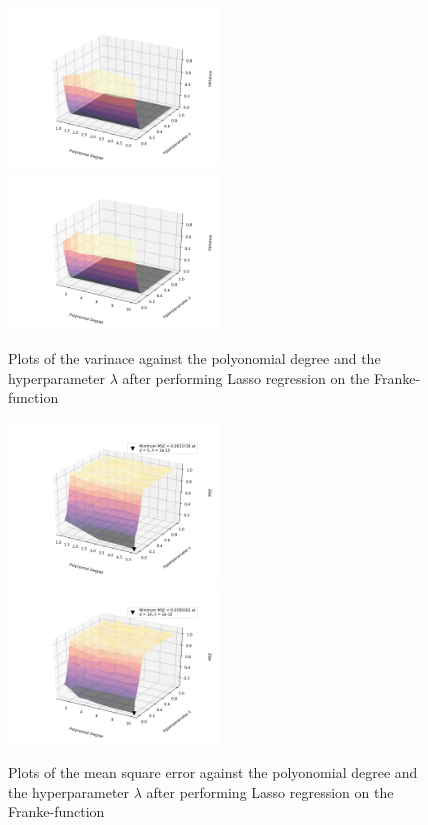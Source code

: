 \documentclass[a4paper,10pt,english]{article}
\begin{document}

\begin{figure}[H]
	\centering 
	\includegraphics[width = 0.5\textwidth, center]{../franke_output/part_E_1.png}
	\includegraphics[width = 0.5\textwidth, center]{../franke_output/part_E_1_highdeg.png}
	\caption{
		Plots of the varinace against the polyonomial degree and the hyperparameter $\lambda$ after performing Lasso regression on the Franke-function
	}
	\label{part_e1}
\end{figure}

\begin{figure}[H]
	\centering 
	\includegraphics[width = 0.5\textwidth, center]{../franke_output/part_E_2.png}
	\includegraphics[width = 0.5\textwidth, center]{../franke_output/part_E_2_highdeg.png}
	\caption{
		Plots of the mean square error against the polyonomial degree and the hyperparameter $\lambda$ after performing Lasso regression on the Franke-function 
	}
	\label{part_e2}
\end{figure}
\end{document}
